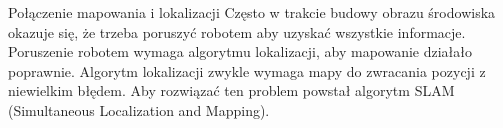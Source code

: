 \begin{frame}
{Połączenie mapowania i lokalizacji}
	Często w trakcie budowy obrazu środowiska okazuje się, że trzeba poruszyć robotem aby uzyskać wszystkie informacje.
	Poruszenie robotem wymaga algorytmu lokalizacji, aby mapowanie działało poprawnie.
	Algorytm lokalizacji zwykle wymaga mapy do zwracania pozycji z niewielkim błędem.
	Aby rozwiązać ten problem powstał algorytm SLAM (Simultaneous Localization and Mapping).
\end{frame}